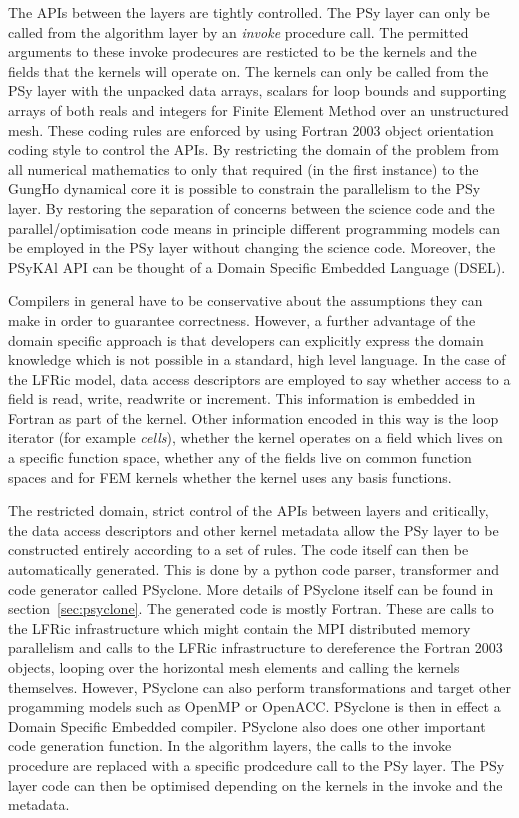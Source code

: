 \documentclass[review,times]{elsarticle}
\begin{document}
The APIs between the layers are tightly controlled. The PSy layer can
only be called from the algorithm layer by an {\em invoke} procedure
call. The permitted arguments to these invoke prodecures are resticted
to be the kernels and the fields that the kernels will operate on. The
kernels can only be called from the PSy layer with the unpacked data
arrays, scalars for loop bounds and supporting arrays of both reals
and integers for Finite Element Method over an unstructured mesh.
These coding rules are enforced by using Fortran 2003 object
orientation coding style to control the APIs. By restricting the
domain of the problem from all numerical mathematics to only that
required (in the first instance) to the GungHo dynamical core it is
possible to constrain the parallelism to the PSy layer. By restoring
the separation of concerns between the science code and the
parallel/optimisation code means in principle different programming
models can be employed in the PSy layer without changing the science
code. Moreover, the PSyKAl API can be thought of a Domain Specific
Embedded Language (DSEL).

Compilers in general have to be conservative about the assumptions
they can make in order to guarantee correctness. However, a further
advantage of the domain specific approach is that developers can
explicitly express the domain knowledge which is not possible in a
standard, high level language. In the case of the LFRic model, data
access descriptors are employed to say whether access to a field is
read, write, readwrite or increment. This information is embedded in
Fortran as part of the kernel. Other information encoded in this way
is the loop iterator (for example {\em cells}), whether the kernel
operates on a field which lives on a specific function space, whether
any of the fields live on common function spaces and for FEM kernels
whether the kernel uses any basis functions. 

The restricted domain, strict control of the APIs between layers and
critically, the data access descriptors and other kernel metadata
allow the PSy layer to be constructed entirely according to a set of
rules. The code itself can then be automatically generated. This is
done by a python code parser, transformer and code generator called
PSyclone. More details of PSyclone itself can be found in
section~\ref{sec:psyclone}. The generated code is mostly Fortran.
These are calls to the LFRic infrastructure which might contain the
MPI distributed memory parallelism and calls to the LFRic
infrastructure to dereference the Fortran 2003 objects, looping over
the horizontal mesh elements and calling the kernels
themselves. However, PSyclone can also perform transformations and
target other progamming models such as OpenMP or OpenACC. PSyclone is
then in effect a Domain Specific Embedded compiler. PSyclone also does
one other important code generation function. In the algorithm layers,
the calls to the invoke procedure are replaced with a specific
prodcedure call to the PSy layer. The PSy layer code can then be
optimised depending on the kernels in the invoke and the metadata.
\end{document}
